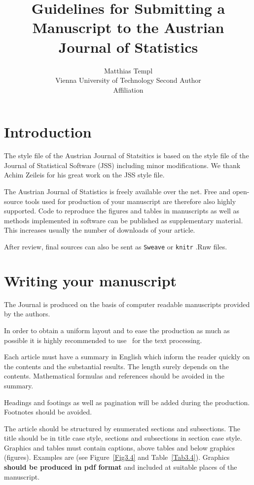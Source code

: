 \documentclass[article]{ajs}
\author{Matthias Templ\\ Vienna University of Technology \And 
        Second Author\\ Affiliation}
\title{Guidelines for Submitting a Manuscript to the Austrian Journal of Statistics}
\begin{document}


\section{Introduction}


The style file of the Austrian Journal of Statsitics is based on the style file of the Journal of Statistical Software (JSS) including minor modifications. We thank Achim Zeileis for his great work on the JSS style file.

The Austrian Journal of Statistics is freely available over the net. Free and open-source tools used for production of your manuscript are therefore also highly supported. Code to reproduce the figures and tables in manuscripts as well as methods implemented in software can be published as supplementary material. This increases usually the number of 
downloads of your article.

After review, final sources can also be sent as \texttt{Sweave} \citep[see, e.g.,][]{leisch02} or \texttt{knitr} \citep{yihui13} .Rnw files.



\section{Writing your manuscript}

The Journal is produced on the basis of computer readable
manuscripts provided by the authors. 


In order to obtain a uniform layout and to ease the production as
much as possible it is highly recommended to use \LaTeXe\ for the
text processing. 

Each article must have a summary in English which
inform the reader quickly on the contents and the substantial
results. The length surely depends on the contents. 
Mathematical formulas and references should be
avoided in the summary.

Headings and footings as well as pagination will be added during
the production. Footnotes should be avoided.

The article should be structured by enumerated sections and
subsections. The title should be in title case style, sections and subsections in section case style. Graphics and tables must contain captions, above
tables and below graphics (figures). Examples are (see Figure~\ref{Fig3.4} and Table~\ref{Tab3.4}).
Graphics \textbf{should be produced in \textbf{pdf} format} and included 
 at suitable places of the manuscript. 
\end{document}
